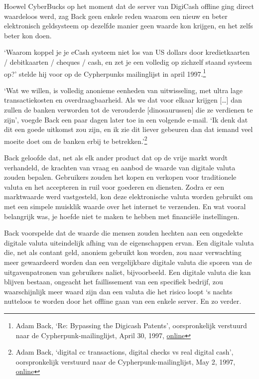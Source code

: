 \documentclass[
  a5paper,
  smalldemyvopaper,11pt,twoside,onecolumn,openright,extrafontsizes,
hidelinks]{memoir}
\begin{document}
Hoewel CyberBucks op het moment dat de server van DigiCash offline ging
direct waardeloos werd, zag Back geen enkele reden waarom een nieuw en
beter elektronisch geldsysteem op dezelfde manier geen waarde kon
krijgen, en het zelfs beter kon doen.

`Waarom koppel je je eCash systeem niet los van US dollars door
kredietkaarten / debitkaarten / cheques / cash, en zet je een volledig
op zichzelf staand systeem op?' stelde hij voor op de Cypherpunks
mailinglijst in april 1997.\footnote{Adam Back, `Re: Bypassing the
  Digicash Patents', oorspronkelijk verstuurd naar de
  Cypherpunk-mailinglijst, April 30, 1997,
  \href{https://cypherpunks.venona.com/date/1997/04/msg00822.html}{online}}

`Wat we willen, is volledig anonieme eenheden van uitwisseling, met
ultra lage transactiekosten en overdraagbaarheid. Als we dat voor elkaar
krijgen {[}\ldots{]} dan zullen de banken verworden tot de verouderde
{[}dinosaurussen{]} die ze verdienen te zijn', voegde Back een paar
dagen later toe in een volgende e-mail. `Ik denk dat dit een goede
uitkomst zou zijn, en ik zie dit liever gebeuren dan dat iemand veel
moeite doet om de banken erbij te betrekken.'\footnote{Adam Back,
  `digital cc transactions, digital checks vs real digital cash',
  oorspronkelijk verstuurd naar de Cypherpunk-mailinglijst, May 2, 1997,
  \href{https://cypherpunks.venona.com/date/1997/05/msg00104.html}{online}}

Back geloofde dat, net als elk ander product dat op de vrije markt wordt
verhandeld, de krachten van vraag en aanbod de waarde van digitale
valuta zouden bepalen. Gebruikers zouden het kopen en verkopen voor
traditionele valuta en het accepteren in ruil voor goederen en diensten.
Zodra er een marktwaarde werd vastgesteld, kon deze elektronische valuta
worden gebruikt om met een simpele muisklik waarde over het internet te
verzenden. En wat vooral belangrijk was, je hoefde niet te maken te
hebben met financiële instellingen.

Back voorspelde dat de waarde die mensen zouden hechten aan een
ongedekte digitale valuta uiteindelijk afhing van de eigenschappen
ervan. Een digitale valuta die, net als contant geld, anoniem gebruikt
kon worden, zou naar verwachting meer gewaardeerd worden dan een
vergelijkbare digitale valuta die sporen van de uitgavenpatronen van
gebruikers naliet, bijvoorbeeld. Een digitale valuta die kan blijven
bestaan, ongeacht het faillissement van een specifiek bedrijf, zou
waarschijnlijk meer waard zijn dan een valuta die het risico loopt `s
nachts nutteloos te worden door het offline gaan van een enkele server.
En zo verder.
\end{document}
